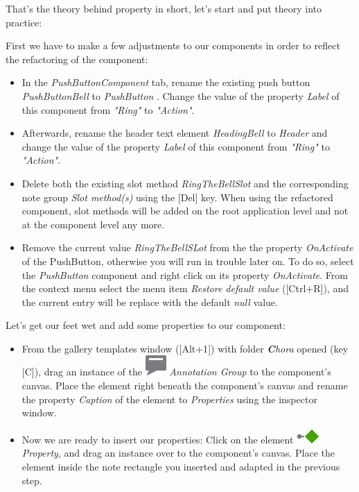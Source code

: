 \documentclass[
  a4paper,
,tablecaptionabove
]{scrbook}
\begin{document}
That's the theory behind property in short, let's start and put theory
into practice:

First we have to make a few adjustments to our components in order to
reflect the refactoring of the component:

\begin{itemize}
\item
  In the \emph{PushButtonComponent} tab, rename the existing push button
  \emph{PushButtonBell} to \emph{PushButton} . Change the value of the
  property \emph{Label} of this component from \emph{"Ring"} to
  \emph{"Action"}.
\item
  Afterwards, rename the header text element \emph{HeadingBell} to
  \emph{Header} and change the value of the property \emph{Label} of
  this component from \emph{"Ring"} to \emph{"Action"}.
\item
  Delete both the existing slot method \emph{RingTheBellSlot} and the
  corresponding note group \emph{Slot method(s)} using the {[}Del{]}
  key. When using the refactored component, slot methods will be added
  on the root application level and not at the component level any more.
\item
  Remove the current value \emph{RingTheBellSLot} from the the property
  \emph{OnActivate} of the PushButton, otherwise you will run in trouble
  later on. To do so, select the \emph{PushButton} component and right
  click on its property \emph{OnActivate}. From the context menu select
  the menu item \emph{Restore default value} ({[}Ctrl+R{]}), and the
  current entry will be replace with the default \emph{null} value.
\end{itemize}

Let's get our feet wet and add some properties to our component:

\begin{itemize}
\item
  From the gallery templates window ({[}Alt+1{]}) with folder
  \emph{\textbf{C}hora} opened (key {[}C{]}), drag an instance of
  the
  \includegraphics{./../asciidoc/modules/ROOT/assets/images/icons/AnnotationGroupIcon.png}
  \emph{Annotation Group} to the component's canvas. Place the element
  right beneath the component's canvas and rename the property
  \emph{Caption} of the element to \emph{Properties} using the inspector
  window.
\item
  Now we are ready to insert our properties: Click on the element
  \includegraphics{./../asciidoc/modules/ROOT/assets/images/icons/PropertyIcon.png}
  \emph{Property}, and drag an instance over to the component's canvas.
  Place the element inside the note rectangle you inserted and adapted
  in the previous step.
\end{itemize}
\end{document}
